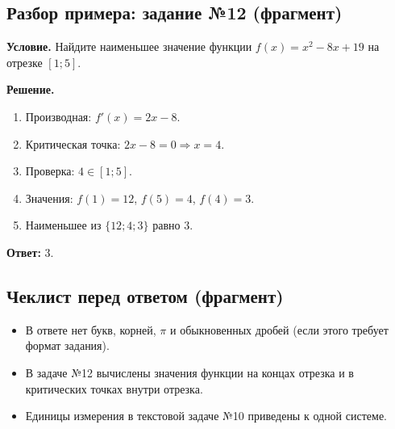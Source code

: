 \subsection*{Разбор примера: задание №12 (фрагмент)}

\textbf{Условие.} Найдите наименьшее значение функции
$f(x) = x^2 - 8x + 19$ на отрезке $[1; 5]$.

\textbf{Решение.}
\begin{enumerate}
    \item Производная: $f'(x) = 2x - 8$.
    \item Критическая точка: $2x - 8 = 0 \Rightarrow x = 4$.
    \item Проверка: $4 \in [1; 5]$.
    \item Значения: $f(1) = 12$, $f(5) = 4$, $f(4) = 3$.
    \item Наименьшее из $\{12; 4; 3\}$ равно $3$.
\end{enumerate}

\textbf{Ответ:} $3$.

\subsection*{Чеклист перед ответом (фрагмент)}

\begin{itemize}
    \item В ответе нет букв, корней, $\pi$ и обыкновенных дробей (если этого требует формат задания).
    \item В задаче №12 вычислены значения функции на концах отрезка и в критических точках внутри отрезка.
    \item Единицы измерения в текстовой задаче №10 приведены к одной системе.
\end{itemize}
